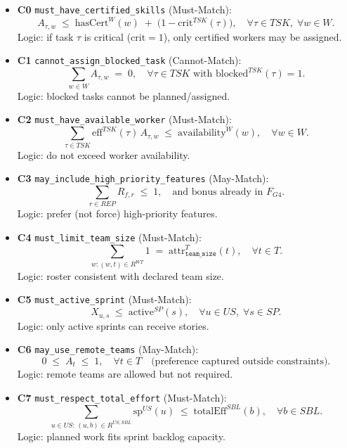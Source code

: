 \documentclass[11pt,a4paper]{article}
\begin{document}
\begin{itemize}[leftmargin=2em]
  \item \textbf{C0} \texttt{must\_have\_certified\_skills} (Must-Match):
  \[
  A_{\tau,w} \;\le\; \mathrm{hasCert}^{W}(w) \;+\; \big(1-\mathrm{crit}^{TSK}(\tau)\big),
  \quad \forall \tau\in TSK,\;\forall w\in W.
  \]
  Logic: if task $\tau$ is critical ($\mathrm{crit}=1$), only certified workers may be assigned.

  \item \textbf{C1} \texttt{cannot\_assign\_blocked\_task} (Cannot-Match):
  \[
  \sum_{w\in W} A_{\tau,w} \;=\; 0,\quad \forall \tau\in TSK \text{ with }\mathrm{blocked}^{TSK}(\tau)=1.
  \]
  Logic: blocked tasks cannot be planned/assigned.

  \item \textbf{C2} \texttt{must\_have\_available\_worker} (Must-Match):
  \[
  \sum_{\tau\in TSK}\mathrm{eff}^{TSK}(\tau)\,A_{\tau,w} \;\le\; \mathrm{availability}^{W}(w),\quad \forall w\in W.
  \]
  Logic: do not exceed worker availability.

  \item \textbf{C3} \texttt{may\_include\_high\_priority\_features} (May-Match):
  \[
  \sum_{r\in REP} R_{f,r} \;\le\; 1,\quad
  \text{and bonus already in }F_{G4}.
  \]
  Logic: prefer (not force) high-priority features.

  \item \textbf{C4} \texttt{must\_limit\_team\_size} (Must-Match):
  \[
  \sum_{w:(w,t)\in R^{WT}} 1 \;=\; \mathrm{attr}^{T}_{\texttt{team\_size}}(t),\quad \forall t\in T.
  \]
  Logic: roster consistent with declared team size.

  \item \textbf{C5} \texttt{must\_active\_sprint} (Must-Match):
  \[
  X_{u,s} \;\le\; \mathrm{active}^{SP}(s),\quad \forall u\in US,\;\forall s\in SP.
  \]
  Logic: only active sprints can receive stories.

  \item \textbf{C6} \texttt{may\_use\_remote\_teams} (May-Match):
  \[
  0 \;\le\; A_t \;\le\; 1,\quad \forall t\in T
  \quad\text{(preference captured outside constraints).}
  \]
  Logic: remote teams are allowed but not required.

  \item \textbf{C7} \texttt{must\_respect\_total\_effort} (Must-Match):
  \[
  \sum_{u\in US:\,(u,b)\in R^{US,SBL}} \mathrm{sp}^{US}(u) \;\le\; \mathrm{totalEff}^{SBL}(b),\quad \forall b\in SBL.
  \]
  Logic: planned work fits sprint backlog capacity.


\end{itemize}
\end{document}
